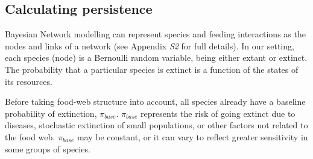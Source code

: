 \documentclass[12pt]{article}
\begin{document}
\begin{spacing}{2.0}
		
		
	\subsection*{Calculating persistence}	
        Bayesian Network modelling can represent species and feeding interactions as the nodes and links of a network (see Appendix \emph{S2} for full details).
        In our setting, each species (node) is a Bernoulli random variable, being either extant or extinct. 
        The probability that a particular species is extinct is a function of the states of its resources.
        
  
		Before taking food-web structure into account, all species already have a baseline probability of extinction, $\pi_{base}$. 
		$\pi_{base}$ represents the risk of going extinct due to diseases, stochastic extinction of small populations, or other factors not related to the food web.
		$\pi_{base}$ may be constant, or it can vary to reflect greater sensitivity in some groups of species.
		


\end{spacing}
\end{document}
